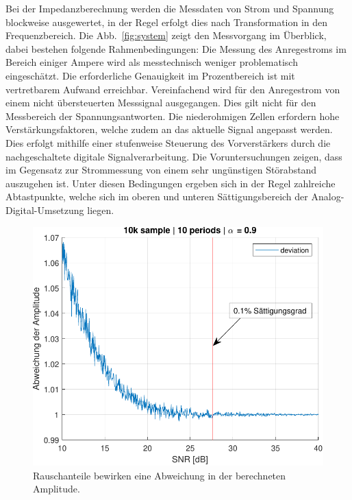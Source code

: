 \smallskip
Bei der Impedanzberechnung werden die Messdaten von Strom und Spannung blockweise ausgewertet, in der Regel erfolgt dies nach Transformation in den Frequenzbereich. Die Abb.~\ref{fig:system} zeigt den Messvorgang im Überblick, dabei bestehen folgende Rahmenbedingungen: Die Messung des Anregestroms im Bereich einiger Ampere wird als messtechnisch weniger problematisch eingeschätzt. Die erforderliche Genauigkeit im Prozentbereich ist mit vertretbarem Aufwand erreichbar. Vereinfachend wird für den Anregestrom von einem nicht übersteuerten Messsignal ausgegangen. Dies gilt nicht für den Messbereich der Spannungsantworten. Die niederohmigen Zellen erfordern hohe Verstärkungsfaktoren, welche zudem an das aktuelle Signal angepasst werden. Dies erfolgt mithilfe einer stufenweise Steuerung des Vorverstärkers durch die nachgeschaltete digitale Signalverarbeitung. Die Voruntersuchungen zeigen, dass im Gegensatz zur Strommessung von einem sehr ungünstigen Störabstand auszugehen ist. Unter diesen Bedingungen ergeben sich in der Regel zahlreiche Abtastpunkte, welche sich im oberen und unteren Sättigungsbereich der Analog-Digital-Umsetzung liegen.

\begin{figure}[t!] 
	\centering
	\includegraphics[width=1\columnwidth]{../img/noise-err.pdf}
	\caption{Rauschanteile bewirken eine Abweichung in der berechneten Amplitude.}
	\label{fig:Rauschanteil}
\end{figure}

